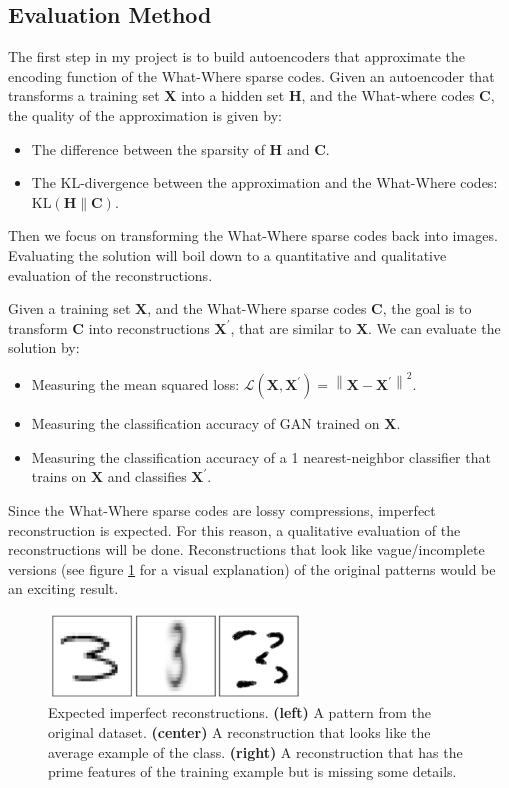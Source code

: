 \documentclass[runningheads]{llncs}
\begin{document}
\subsection{Evaluation Method}
The first step in my project is to build autoencoders that approximate the encoding function of the What-Where sparse codes.
Given an autoencoder that transforms a training set $\mathbf{X}$ into a hidden set $\mathbf{H}$, and the What-where codes $\mathbf{C}$, the quality of the approximation is given by:
\begin{itemize}
    \item The difference between the sparsity of $\mathbf{H}$ and $\mathbf{C}$.
    \item The KL-divergence between the approximation and the What-Where codes: $\mathrm{KL}\left(\mathbf{H} \| \mathbf{C}\right)$.
\end{itemize}

Then we focus on transforming the What-Where sparse codes back into images.
Evaluating the solution will boil down to a quantitative and qualitative evaluation of the reconstructions.

Given a training set $\mathbf{X}$, and the What-Where sparse codes $\mathbf{C}$, the goal is to transform $\mathbf{C}$ into reconstructions $\mathbf{X}^{\prime}$, that are similar to $\mathbf{X}$.
We can evaluate the solution by:
\begin{itemize}
    \item Measuring the mean squared loss: $\mathcal{L}\left(\mathbf{X}, \mathbf{X}^{\prime}\right)=\left\|\mathbf{X}-\mathbf{X}^{\prime}\right\|^{2}$.
    \item Measuring the classification accuracy of GAN trained on $\mathbf{X}$.
    \item Measuring the classification accuracy of a 1 nearest-neighbor classifier that trains on $\mathbf{X}$ and classifies $\mathbf{X}^{\prime}$.
\end{itemize}
Since the What-Where sparse codes are lossy compressions, imperfect reconstruction is expected. For this reason, a qualitative evaluation of the reconstructions will be done. Reconstructions that look like vague/incomplete versions (see figure \ref{fig:imperfect_recon} for a visual explanation) of the original patterns would be an exciting result.

\begin{figure}[h]
    \centering
    \includegraphics[width=0.6\textwidth]{introduction/img/result_prediction.png}
    \caption{Expected imperfect reconstructions. \textbf{(left)} A pattern from the original dataset. \textbf{(center)} A reconstruction that looks like the average example of the class. \textbf{(right)} A reconstruction that has the prime features of the training example but is missing some details.}
    \label{fig:imperfect_recon}
\end{figure}
\end{document}
